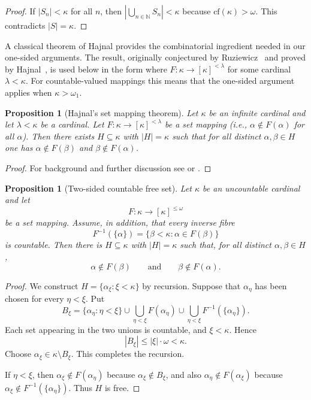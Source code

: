 \documentclass[11pt]{amsart}
\theoremstyle{plain}
\newtheorem{proposition}[theorem]{Proposition}
\theoremstyle{definition}
\numberwithin{equation}{section}
\newcommand{\abs}[1]{\left|#1\right|}
\newcommand{\N}{\mathbb{N}}
\newcommand{\cf}{\mathrm{cf}}
\renewcommand{\le}{\leqslant}
\begin{document}
\begin{proof}
If $\abs{S_n}<\kappa$ for all $n$, then $\abs{\bigcup_{n\in\N}S_n}<\kappa$ because $\cf(\kappa)>\omega$.
This contradicts $\abs{S}=\kappa$.
\end{proof}

A classical theorem of Hajnal provides the
combinatorial ingredient needed in our one-sided arguments. The result,
originally conjectured by Ruziewicz~\cite{Ruziewicz1936}
and proved by Hajnal~\cite{Hajnal1961}, is used below in the form where
$F:\kappa\to[\kappa]^{<\lambda}$ for some cardinal $\lambda<\kappa$.
For countable-valued mappings this means that the one-sided argument applies
when $\kappa>\omega_1$.

\begin{proposition}[Hajnal's set mapping theorem]\label{prop:hajnal}
Let $\kappa$ be an infinite cardinal and let $\lambda < \kappa$ be a cardinal. 
Let $F\colon\kappa\to[\kappa]^{<\lambda}$ be a set mapping (i.e., $\alpha \notin F(\alpha)$ for all $\alpha$).
Then there exists $H\subseteq\kappa$ with $\abs{H}=\kappa$ such that for all distinct
$\alpha,\beta\in H$ one has $\alpha\notin F(\beta)$ and $\beta\notin F(\alpha)$.
\end{proposition}
%
\begin{proof}
For background and further discussion see
\cite[Theorem~46.1]{EHRR} or \cite[\S3.1]{Williams1977}.
\end{proof}

\begin{proposition}[Two-sided countable free set]\label{prop:two-sided-countable-free}
Let $\kappa$ be an uncountable cardinal and let
\[
    F\colon \kappa\to[\kappa]^{\le\omega}
\]
be a set mapping.  Assume, in addition, that every inverse fibre
\[
    F^{-1}(\{\alpha\})
    =
    \{\beta<\kappa:\alpha\in F(\beta)\}
\]
is countable.  Then there is $H\subseteq\kappa$ with $\abs{H}=\kappa$ such that, for all distinct
$\alpha,\beta\in H$,
\[
    \alpha\notin F(\beta)
    \qquad\text{and}\qquad
    \beta\notin F(\alpha).
\]
\end{proposition}

\begin{proof}
We construct $H=\{\alpha_\xi:\xi<\kappa\}$ by recursion.  Suppose that
$\alpha_\eta$ has been chosen for every $\eta<\xi$.  Put
\[
    B_\xi
    =
    \{\alpha_\eta:\eta<\xi\}
    \cup
    \bigcup_{\eta<\xi} F(\alpha_\eta)
    \cup
    \bigcup_{\eta<\xi} F^{-1}(\{\alpha_\eta\}).
\]
Each set appearing in the two unions is countable, and $\xi<\kappa$.  Hence
\[
    \abs{B_\xi}\le \abs{\xi}\cdot\omega<\kappa.
\]
Choose $\alpha_\xi\in\kappa\setminus B_\xi$.  This completes the recursion.

If $\eta<\xi$, then $\alpha_\xi\notin F(\alpha_\eta)$ because
$\alpha_\xi\notin B_\xi$, and also $\alpha_\eta\notin F(\alpha_\xi)$ because
$\alpha_\xi\notin F^{-1}(\{\alpha_\eta\})$.  Thus $H$ is free.
\end{proof}
\end{document}
